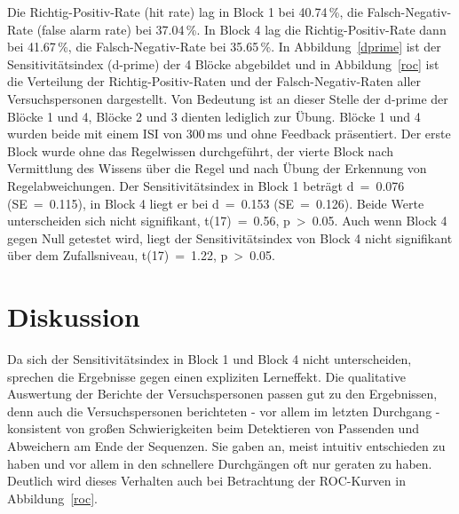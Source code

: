 \documentclass[doc,a4paper,12pt]{apa6}
\begin{document}
Die Richtig-Positiv-Rate (hit rate) lag in Block 1 bei 40.74\,\%, die Falsch-Negativ-Rate (false alarm rate) bei 37.04\,\%. In Block 4 lag die Richtig-Positiv-Rate dann bei 41.67\,\%, die Falsch-Negativ-Rate bei 35.65\,\%. In Abbildung~\ref{dprime} ist der Sensitivitätsindex (d-prime) der 4 Blöcke abgebildet und in Abbildung~\ref{roc} ist die Verteilung der Richtig-Positiv-Raten und der Falsch-Negativ-Raten aller Versuchspersonen dargestellt. Von Bedeutung ist an dieser Stelle der d-prime der Blöcke 1 und 4, Blöcke 2 und 3 dienten lediglich zur Übung. Blöcke 1 und 4 wurden beide mit einem ISI von 300\,ms und ohne Feedback präsentiert. Der erste Block wurde ohne das Regelwissen durchgeführt, der vierte Block nach Vermittlung des Wissens über die Regel und nach Übung der Erkennung von Regelabweichungen. Der Sensitivitätsindex in Block 1 beträgt d~=~0.076 (SE~=~0.115), in Block 4 liegt er bei d~=~0.153 (SE~=~0.126). Beide Werte unterscheiden sich nicht signifikant, t(17)~=~0.56, p~>~0.05. Auch wenn Block 4 gegen Null getestet wird, liegt der Sensitivitätsindex von Block 4 nicht signifikant über dem Zufallsniveau, t(17)~=~1.22, p~>~0.05.

\section{Diskussion}

Da sich der Sensitivitätsindex in Block 1 und Block 4 nicht unterscheiden, sprechen die Ergebnisse gegen einen expliziten Lerneffekt. Die qualitative Auswertung der Berichte der Versuchspersonen passen gut zu den Ergebnissen, denn auch die Versuchspersonen berichteten - vor allem im letzten Durchgang - konsistent von großen Schwierigkeiten beim Detektieren von Passenden und Abweichern am Ende der Sequenzen. Sie gaben an, meist intuitiv entschieden zu haben und vor allem in den schnellere Durchgängen oft nur geraten zu haben. Deutlich wird dieses Verhalten auch bei Betrachtung der ROC-Kurven in Abbildung~\ref{roc}.
\end{document}
